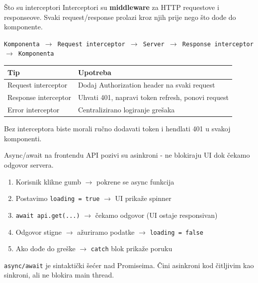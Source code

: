 \begin{frame}{Što su interceptori}
Interceptori su \textbf{middleware} za HTTP requestove i responseove. Svaki request/response prolazi kroz njih prije nego što dođe do komponente.

\vspace{0.6em}
\begin{center}
\texttt{Komponenta $\rightarrow$ Request interceptor $\rightarrow$ Server $\rightarrow$ Response interceptor $\rightarrow$ Komponenta}
\end{center}

\vspace{0.6em}
\begin{tabular}{@{}lp{8cm}@{}}
  \toprule
  \textbf{Tip} & \textbf{Upotreba} \\
  \midrule
  Request interceptor & Dodaj Authorization header na svaki request \\
  Response interceptor & Uhvati 401, napravi token refresh, ponovi request \\
  Error interceptor & Centralizirano logiranje grešaka \\
  \bottomrule
\end{tabular}

\vspace{0.4em}
Bez interceptora biste morali ručno dodavati token i hendlati 401 u svakoj komponenti.
\end{frame}

\begin{frame}{Async/await na frontendu}
API pozivi su asinkroni - ne blokiraju UI dok čekamo odgovor servera.

\vspace{0.4em}
\begin{enumerate}
  \item Korisnik klikne gumb $\rightarrow$ pokrene se async funkcija
  \item Postavimo \texttt{loading = true} $\rightarrow$ UI prikaže spinner
  \item \texttt{await api.get(...)} $\rightarrow$ čekamo odgovor (UI ostaje responsivan)
  \item Odgovor stigne $\rightarrow$ ažuriramo podatke $\rightarrow$ \texttt{loading = false}
  \item Ako dođe do greške $\rightarrow$ \texttt{catch} blok prikaže poruku
\end{enumerate}

\vspace{0.6em}
\texttt{async/await} je sintaktički šećer nad Promiseima. Čini asinkroni kod čitljivim kao sinkroni, ali ne blokira main thread.
\end{frame}

